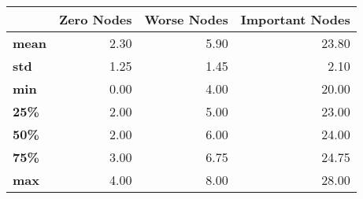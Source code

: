 \begin{tabular}{lrrr}
\toprule
{} &  Zero Nodes &  Worse Nodes &  Important Nodes \\
\midrule
\textbf{mean} &        2.30 &         5.90 &            23.80 \\
\textbf{std } &        1.25 &         1.45 &             2.10 \\
\textbf{min } &        0.00 &         4.00 &            20.00 \\
\textbf{25\% } &        2.00 &         5.00 &            23.00 \\
\textbf{50\% } &        2.00 &         6.00 &            24.00 \\
\textbf{75\% } &        3.00 &         6.75 &            24.75 \\
\textbf{max } &        4.00 &         8.00 &            28.00 \\
\bottomrule
\end{tabular}
